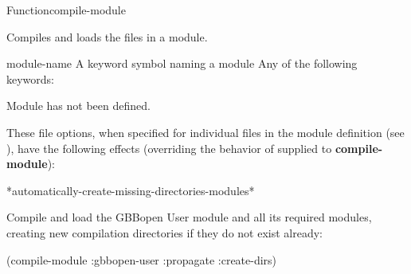 \documentclass[10pt,twoside,english,pdftex]{article}
\begin{document}
\begin{functiondoc}{Function}{compile-module}{ 
    } 
%
% 
%
%
%

\fnsyntax 

\fnpurpose Compiles and loads the files in a module.

\fnpackage {}

\fnmodule {}

\fnargs
\begin{args}{module-name}
 A keyword symbol naming a module 
\arg[option] Any of the following keywords: 
\compilemoduleoptions
\end{args}

\fnerrors Module  has not been defined.

\fndescription These file options, when specified for individual files in the
module definition (see \textbf{}), have the
following effects (overriding the behavior of  supplied to
\textbf{compile-module}): \compilemodulefileoptions

\begin{alsos}{*automatically-create-missing-directories-modules*}
\end{alsos}

\fnexample Compile and load the GBBopen User module and all its
required modules, creating new compilation directories if they do not
exist already:
\begin{example}
  (compile-module :gbbopen-user :propagate :create-dirs)
\end{example}

\end{functiondoc}

\end{document}
